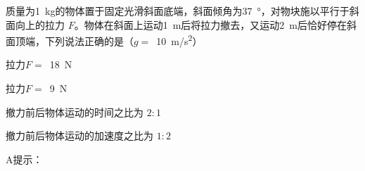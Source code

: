 质量为\qty{1}{kg}的物体置于固定光滑斜面底端，斜面倾角为\qty{37}{\degree}，对物块施以平行于斜面向上的拉力 $F$。物体在斜面上运动\qty{1}{m}后将拉力撤去，又运动\qty{2}{m}后恰好停在斜面顶端，下列说法正确的是（\(g =\) \,\qty{10}{m/s^2}）\paren[]
	
\begin{choices}
	\item 拉力\(F =\) \,\qty{18}{N}
	\item 拉力\(F =\) \,\qty{9}{N}
	\item 撤力前后物体运动的时间之比为 $2:1$
	\item 撤力前后物体运动的加速度之比为 $1:2$
\end{choices}
\begin{answer}
    A\qquad 提示：
\end{answer}